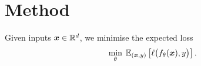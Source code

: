 \section{Method}
\label{sec:method}

Given inputs $\bm{x} \in \mathbb{R}^d$, we minimise the expected loss
\begin{equation}
  \label{eq:objective}
  \min_{\theta} \; \mathbb{E}_{(\bm{x}, y)} \left[ \ell\big(f_\theta(\bm{x}), y\big) \right].
\end{equation}
